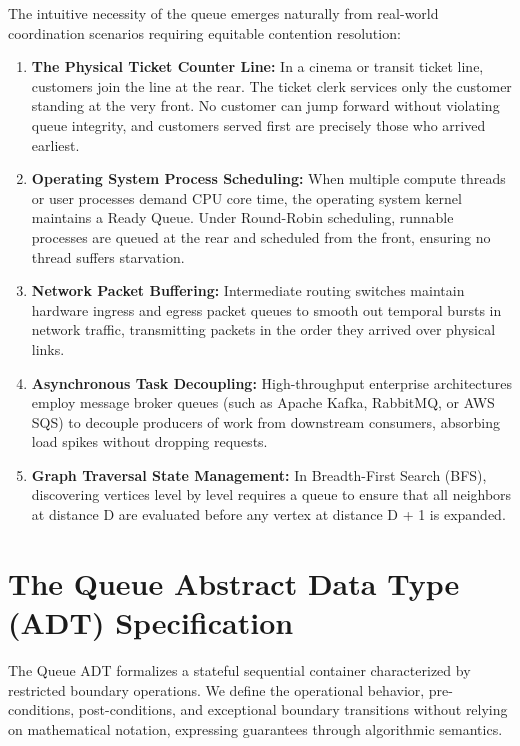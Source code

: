 \documentclass[10pt,journal,compsoc,onecolumn]{IEEEtran}
\begin{document}
The intuitive necessity of the queue emerges naturally from real-world coordination scenarios requiring equitable contention resolution:
\begin{enumerate}
    \item \textbf{The Physical Ticket Counter Line:} In a cinema or transit ticket line, customers join the line at the rear. The ticket clerk services only the customer standing at the very front. No customer can jump forward without violating queue integrity, and customers served first are precisely those who arrived earliest.
    \item \textbf{Operating System Process Scheduling:} When multiple compute threads or user processes demand CPU core time, the operating system kernel maintains a Ready Queue. Under Round-Robin scheduling, runnable processes are queued at the rear and scheduled from the front, ensuring no thread suffers starvation.
    \item \textbf{Network Packet Buffering:} Intermediate routing switches maintain hardware ingress and egress packet queues to smooth out temporal bursts in network traffic, transmitting packets in the order they arrived over physical links.
    \item \textbf{Asynchronous Task Decoupling:} High-throughput enterprise architectures employ message broker queues (such as Apache Kafka, RabbitMQ, or AWS SQS) to decouple producers of work from downstream consumers, absorbing load spikes without dropping requests.
    \item \textbf{Graph Traversal State Management:} In Breadth-First Search (BFS), discovering vertices level by level requires a queue to ensure that all neighbors at distance D are evaluated before any vertex at distance D + 1 is expanded.
\end{enumerate}

\section{The Queue Abstract Data Type (ADT) Specification}
\label{sec:queue_adt}

The Queue ADT formalizes a stateful sequential container characterized by restricted boundary operations. We define the operational behavior, pre-conditions, post-conditions, and exceptional boundary transitions without relying on mathematical notation, expressing guarantees through algorithmic semantics.
\end{document}

